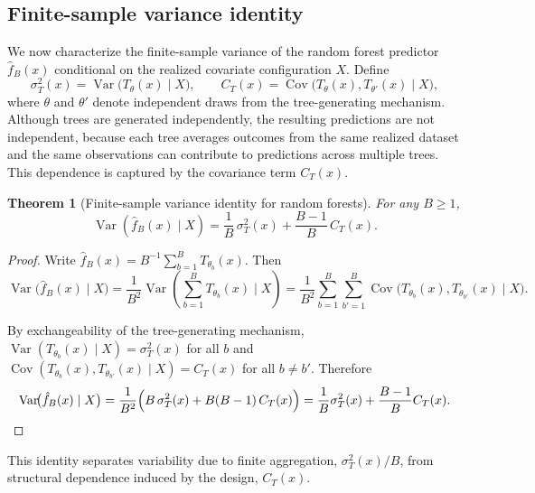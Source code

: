 \documentclass[11pt]{article}
\theoremstyle{plain}
\newtheorem{theorem}{Theorem}
\theoremstyle{definition}
\theoremstyle{remark}
\DeclareMathOperator{\Var}{Var}
\DeclareMathOperator{\Cov}{Cov}
\begin{document}
\subsection{Finite-sample variance identity}
\label{subsec:rf_variance_identity}

We now characterize the finite-sample variance of the random forest predictor $\hat f_B(x)$ conditional on the realized covariate configuration $X$. Define
\[
\sigma_T^2(x)
=
\Var\!\bigl(T_\theta(x)\mid X\bigr),
\qquad
C_T(x)
=
\Cov\!\bigl(T_\theta(x),T_{\theta'}(x)\mid X\bigr),
\]
where $\theta$ and $\theta'$ denote independent draws from the tree-generating mechanism. Although trees are generated independently, the resulting predictions are not independent, because each tree averages outcomes from the same realized dataset and the same observations can contribute to predictions across multiple trees. This dependence is captured by the covariance term $C_T(x)$.

\begin{theorem}[Finite-sample variance identity for random forests]
	\label{thm:finite_var}
	For any $B \ge 1$,
	\[
	\Var\!\left(\hat f_B(x)\mid X\right)
	=
	\frac{1}{B}\,\sigma_T^2(x)
	+
	\frac{B-1}{B}\,C_T(x).
	\]
\end{theorem}


\begin{proof}
	Write $\hat f_B(x)=B^{-1}\sum_{b=1}^B T_{\theta_b}(x)$. Then
	\[
	\Var\!\bigl(\hat f_B(x)\mid X\bigr)
	=
	\frac{1}{B^2}\Var\!\left(\sum_{b=1}^B T_{\theta_b}(x)\mid X\right)
	=
	\frac{1}{B^2}\sum_{b=1}^B\sum_{b'=1}^B
	\Cov\!\bigl(T_{\theta_b}(x),T_{\theta_{b'}}(x)\mid X\bigr).
	\]
	
	By exchangeability of the tree-generating mechanism,
	$\Var(T_{\theta_b}(x)\mid X)=\sigma_T^2(x)$ for all $b$
	and $\Cov(T_{\theta_b}(x),T_{\theta_{b'}}(x)\mid X)=C_T(x)$ for all $b\neq b'$.
	Therefore
	\[
	\Var\!\bigl(\hat f_B(x)\mid X\bigr)
	=
	\frac{1}{B^2}\Bigl(B\,\sigma_T^2(x)+B(B-1)\,C_T(x)\Bigr)
	=
	\frac{1}{B}\sigma_T^2(x)+\frac{B-1}{B}C_T(x).
	\]
\end{proof}

This identity separates variability due to finite aggregation, $\sigma_T^2(x)/B$, from structural dependence induced by the design, $C_T(x)$.
\end{document}
